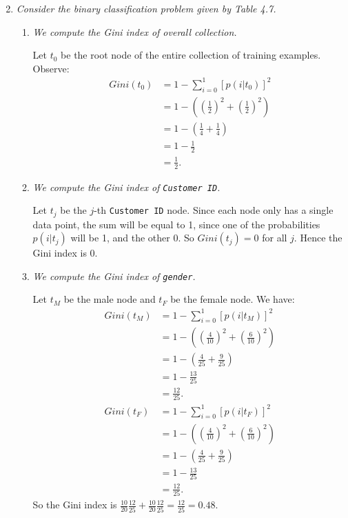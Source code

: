 \documentclass[12pt,oneside,reqno]{amsart}
\theoremstyle{plain}
\theoremstyle{definition}
\theoremstyle{remark}
\newcommand{\bee}{\begin{equation}\begin{aligned}}
\newcommand{\eee}{\end{aligned}\end{equation}}
\newcommand{\fracc}{\frac}
\newcommand{\lpar}{\left(}
\newcommand{\rpar}{\right)}
\newcommand{\inlinecode}{\texttt}
\begin{document}
\begin{enumerate}[label=\arabic*.]
\setcounter{enumi}{1}
\item \textit{Consider the binary classification problem given by Table 4.7.}

\begin{enumerate}
\item \textit{We compute the Gini index of overall collection. }

Let $t_0$ be the root node of the entire collection of training examples. Observe:
\bee
Gini(t_0) &= 1 - \sum_{i = 0}^1[p(i|t_0)]^2\\
&= 1 - \lpar \lpar \fracc{1}{2} \rpar ^2 + \lpar \fracc{1}{2} \rpar ^2 \rpar\\
&= 1 - \lpar \fracc{1}{4} + \fracc{1}{4} \rpar \\
&= 1 - \fracc{1}{2}\\
&= \fracc{1}{2}. 
\eee

\item \textit{We compute the Gini index of \inlinecode{Customer ID}. }

Let $t_j$ be the $j$-th \inlinecode{Customer ID} node. Since each node only has a single data point, the sum will be equal to 1, since one of the probabilities $p(i|t_j)$ will be 1, and the other 0. So $Gini(t_j) = 0$ for all $j$. Hence the Gini index is 0. 

\item \textit{We compute the Gini index of \inlinecode{gender}. }

Let $t_M$ be the male node and $t_F$ be the female node. We have:
\bee
Gini(t_M) &= 1 - \sum_{i = 0}^1[p(i|t_M)]^2\\
&= 1 - \lpar \lpar \fracc{4}{10} \rpar ^2 + \lpar \fracc{6}{10} \rpar^2 \rpar\\
&= 1 - \lpar \fracc{4}{25} + \fracc{9}{25} \rpar \\
&= 1 - \fracc{13}{25}\\
&= \fracc{12}{25}. \\
Gini(t_F) &= 1 - \sum_{i = 0}^1[p(i|t_F)]^2\\
&= 1 - \lpar \lpar \fracc{4}{10} \rpar ^2 + \lpar \fracc{6}{10} \rpar^2 \rpar\\
&= 1 - \lpar \fracc{4}{25} + \fracc{9}{25} \rpar \\
&= 1 - \fracc{13}{25}\\
&= \fracc{12}{25}. 
\eee
So the Gini index is $\fracc{10}{20}\fracc{12}{25} + \fracc{10}{20}\fracc{12}{25} = \fracc{12}{25} = 0.48$. 


\end{enumerate}
\end{enumerate}
\end{document}
